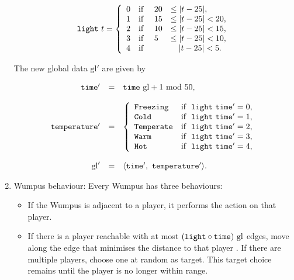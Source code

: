 \begin{definition}
\begin{enumerate}
	$$
			\mathtt{light}\ t = 
			\left\{
				\begin{array}{l l l l}
					0 & \textnormal{if } & 20 & \leq |t - 25|,\\
					1 & \textnormal{if } & 15 & \leq |t - 25| < 20,\\
					2 & \textnormal{if } & 10 & \leq |t - 25| < 15,\\
					3 & \textnormal{if } & 5 & \leq |t - 25| < 10,\\
					4 & \textnormal{if } & & \ \ \ |t - 25| < 5.
				\end{array}
			\right.
	$$
	
	The new global data $\mathrm{gl}'$ are given by
	
	$$
		\begin{array}{r c l}
		   \field{time'} & = &  \field{time}\ \mathrm{gl} + 1\ \mathrm{mod}\ 50,\\
		   \\
			\field{temperature'} & = &
			\left\{
				\begin{array}{l l}
					\type{Freezing} & \mt{if }\ \field{light}\ \field{time'} = 0,\\
					\type{Cold} & \mt{if }\ \field{light}\ \field{time'} = 1,\\
					\type{Temperate} & \mt{if }\ \field{light}\ \field{time'} = 2,\\
					\type{Warm} & \mt{if }\ \field{light}\ \field{time'} = 3,\\
					\type{Hot} & \mt{if }\ \field{light}\ \field{time'} = 4,
				\end{array}
			\right.\\
			\\
			\mathrm{gl}' & = & \langle \field{time'},\ \field{temperature'} \rangle.\\
		\end{array}
	$$
	
	\item {\upshape Wumpus behaviour:} Every Wumpus has three behaviours:
	
	\begin{itemize}
		\item If the Wumpus is adjacent to a player, it performs the  action on that player.
		
		\item If there is a player reachable with at most $(\field{light} \circ \field{time})\ \mathrm{gl}$ edges, move along the edge that minimises the distance to that player . If there are multiple players, choose one at random as target. This target choice remains until the player is no longer within range.
		

\end{itemize}
\end{enumerate}
\end{definition}
